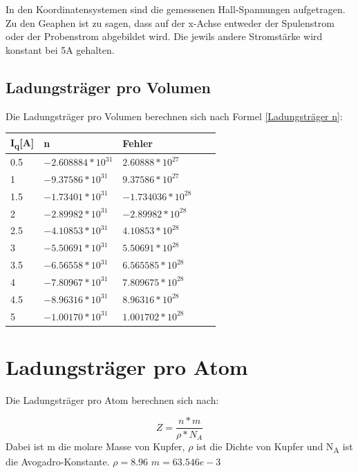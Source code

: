 \documentclass[titlepage=firstcover, captions=tableheading]{scrartcl}
\begin{document}
In den Koordinatensystemen sind die gemessenen Hall-Spannungen aufgetragen.
Zu den Geaphen ist zu sagen, dass auf der x-Achse entweder der Spulenstrom oder der Probenstrom abgebildet wird.
Die jewils andere Stromstärke wird konstant bei 5A gehalten.

\subsection{Ladungsträger pro Volumen}
Die Ladungsträger pro Volumen berechnen sich nach Formel \ref{Ladungsträger n}:
\begin{center}
    \begin{tabular}{ll@{${}\pm{}$}lll}
        \toprule
        I\textsubscript{q}[A]&n&Fehler \\
        \midrule
        0.5 &$ -2.608884*10^{31}$&$2.60888*10^{27} $\\
        1   &$  -9.37586*10^{31}$&$9.37586*10^{27}$\\
        1.5 &$  -1.73401*10^{31}$&$-1.734036*10^{28}$\\
        2   &$  -2.89982*10^{31}$&$-2.89982*10^{28}$\\
        2.5 &$  -4.10853*10^{31}$&$4.10853*10^{28} $\\
        3   &$  -5.50691*10^{31}$&$5.50691*10^{28} $\\
        3.5 &$  -6.56558*10^{31}$&$6.565585*10^{28}$\\
        4   &$  -7.80967*10^{31}$&$7.809675*10^{28}$\\    
        4.5 &$  -8.96316*10^{31}$&$8.96316*10^{28} $\\
        5   &$  -1.00170*10^{31}$&$1.001702*10^{28}$\\
        \bottomrule
    \end{tabular}
\end{center}
\section{Ladungsträger pro Atom}

Die Ladungsträger pro Atom berechnen sich nach:

\begin{displaymath} 
    Z= \frac{n*m}{\rho * N_A}
\end{displaymath}
Dabei ist m die molare Masse von Kupfer, $\rho$ ist die Dichte von Kupfer und N\textsubscript{A} ist die Avogadro-Konstante.
$\rho = 8.96$
$m = 63.546e-3$
\end{document}
